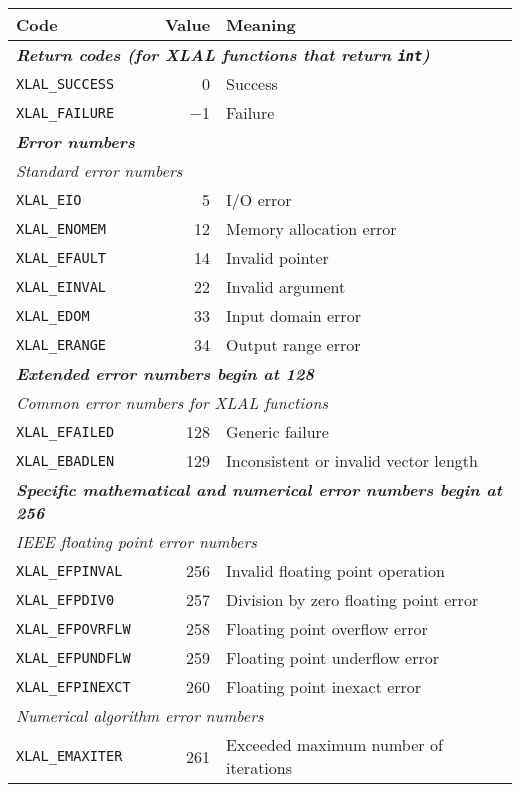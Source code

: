\documentclass[10pt]{ligodcc}
\begin{document}
\begin{center}
\begin{tabular}{|lrl|}
\hline
Code & Value & Meaning \\
\hline
\multicolumn{3}{|l|}{\bfseries\itshape Return codes (for XLAL functions that return {\tt int})} \\
\tt XLAL\_SUCCESS    &     0 & Success \\
\tt XLAL\_FAILURE    &  $-$1 & Failure \\
\hline
\multicolumn{3}{|l|}{\bfseries\itshape Error numbers} \\
\multicolumn{3}{|l|}{\it Standard error numbers} \\
\tt XLAL\_EIO        &     5 & I/O error \\
\tt XLAL\_ENOMEM     &    12 & Memory allocation error \\
\tt XLAL\_EFAULT     &    14 & Invalid pointer \\
\tt XLAL\_EINVAL     &    22 & Invalid argument \\
\tt XLAL\_EDOM       &    33 & Input domain error \\
\tt XLAL\_ERANGE     &    34 & Output range error \\
\multicolumn{3}{|l|}{\bfseries\itshape Extended error numbers begin at 128} \\
\multicolumn{3}{|l|}{\it Common error numbers for XLAL functions} \\
\tt XLAL\_EFAILED    &   128 & Generic failure \\
\tt XLAL\_EBADLEN    &   129 & Inconsistent or invalid vector length \\
\multicolumn{3}{|l|}{\bfseries\itshape Specific mathematical and numerical error numbers begin at 256} \\
\multicolumn{3}{|l|}{\it IEEE floating point error numbers} \\
\tt XLAL\_EFPINVAL   &   256 & Invalid floating point operation \\
\tt XLAL\_EFPDIV0    &   257 & Division by zero floating point error \\
\tt XLAL\_EFPOVRFLW  &   258 & Floating point overflow error \\
\tt XLAL\_EFPUNDFLW  &   259 & Floating point underflow error \\
\tt XLAL\_EFPINEXCT  &   260 & Floating point inexact error \\
\multicolumn{3}{|l|}{\it Numerical algorithm error numbers} \\
\tt XLAL\_EMAXITER   &   261 & Exceeded maximum number of iterations \\

\end{tabular}
\end{center}
\end{document}
